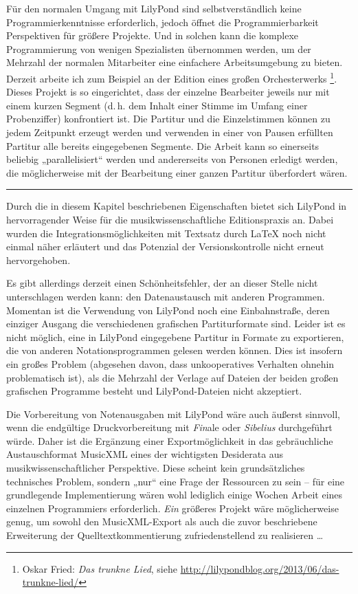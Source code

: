 \documentclass[DIV=12]{scrreprt}
\begin{document}
Für den normalen Umgang mit LilyPond sind selbstverständlich keine Programmierkenntnisse erforderlich, jedoch öffnet die Programmierbarkeit Perspektiven für größere Projekte.
Und in solchen kann die komplexe Programmierung von wenigen Spezialisten übernommen werden, um der Mehrzahl der normalen Mitarbeiter eine einfachere Arbeitsumgebung zu bieten.
Derzeit arbeite ich zum Beispiel an der Edition eines großen Orchesterwerks%
\footnote{Oskar Fried: \emph{Das trunkne Lied}, siehe \url{http://lilypondblog.org/2013/06/das-trunkne-lied/}}.
Dieses Projekt is so eingerichtet, dass der einzelne Bearbeiter jeweils nur mit einem kurzen Segment (d.\,h. dem Inhalt einer Stimme im Umfang einer Probenziffer) konfrontiert ist.
Die Partitur und die Einzelstimmen können zu jedem Zeitpunkt erzeugt werden und verwenden in einer von Pausen erfüllten Partitur alle bereits eingegebenen Segmente.
Die Arbeit kann so einerseits beliebig „parallelisiert“ werden und andererseits von Personen erledigt werden, die möglicherweise mit der Bearbeitung einer ganzen Partitur überfordert wären.

\bigskip
\hrule
\bigskip

Durch die in diesem Kapitel beschriebenen Eigenschaften bietet sich LilyPond in hervorragender Weise für die musikwissenschaftliche Editionspraxis an.
Dabei wurden die Integrationsmöglichkeiten mit Textsatz durch \LaTeX{} noch nicht einmal näher erläutert und das Potenzial der Versionskontrolle nicht erneut hervorgehoben.

Es gibt allerdings derzeit einen Schönheitsfehler, der an dieser Stelle nicht unterschlagen werden kann: den Datenaustausch mit anderen Programmen.
Momentan ist die Verwendung von LilyPond noch eine Einbahnstraße, deren einziger Ausgang die verschiedenen grafischen Partiturformate sind.
Leider ist es nicht möglich, eine in LilyPond eingegebene Partitur in Formate zu exportieren, die von anderen Notationsprogrammen gelesen werden können.
Dies ist insofern ein großes Problem (abgesehen davon, dass unkooperatives Verhalten ohnehin problematisch ist), als die Mehrzahl der Verlage auf Dateien der beiden großen grafischen Programme besteht und LilyPond-Dateien nicht akzeptiert.

Die Vorbereitung von Notenausgaben mit LilyPond wäre auch äußerst sinnvoll, wenn die endgültige Druckvorbereitung mit \emph{Fin}ale oder \emph{Sibelius} durchgeführt würde.
Daher ist die Ergänzung einer Exportmöglichkeit in das gebräuchliche Austauschformat MusicXML eines der wichtigsten Desiderata aus musikwissenschaftlicher Perspektive.
Diese scheint kein grundsätzliches technisches Problem, sondern „nur“ eine Frage der Ressourcen zu sein -- für eine grundlegende Implementierung wären wohl lediglich einige Wochen Arbeit eines einzelnen Programmiers erforderlich.
\emph{Ein} größeres Projekt wäre möglicherweise genug, um sowohl den MusicXML-Export als auch die zuvor beschriebene Erweiterung der Quelltextkommentierung zufriedenstellend zu realisieren \dots
\end{document}
